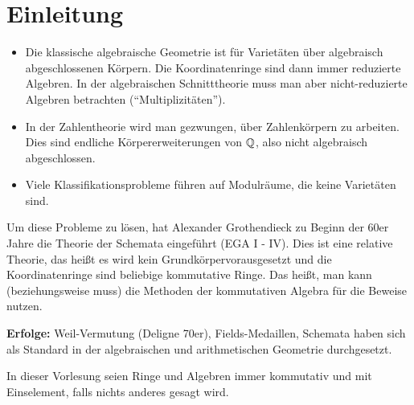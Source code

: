 \chapter{Einleitung}
\begin{itemize}
	\item Die klassische algebraische Geometrie ist für Varietäten über algebraisch abgeschlossenen Körpern. Die Koordinatenringe sind dann immer reduzierte Algebren. In der algebraischen Schnitttheorie muss man aber nicht-reduzierte Algebren betrachten (\enquote{Multiplizitäten}).
	\item In der Zahlentheorie wird man gezwungen, über Zahlenkörpern zu arbeiten. Dies sind endliche Körpererweiterungen von $\mathbb {Q}$, also nicht algebraisch abgeschlossen.
	\item Viele Klassifikationsprobleme führen auf Modulräume, die keine Varietäten sind.
\end{itemize}
Um diese Probleme zu lösen, hat Alexander Grothendieck zu Beginn der 60er Jahre die Theorie der Schemata eingeführt (EGA I - IV). Dies ist eine relative Theorie, das heißt es wird kein Grundkörpervorausgesetzt und die Koordinatenringe sind beliebige kommutative Ringe. Das heißt, man kann (beziehungsweise muss) die Methoden der kommutativen Algebra für die Beweise nutzen.

\textbf{Erfolge:} Weil-Vermutung (Deligne 70er), Fields-Medaillen, Schemata haben sich als Standard in der algebraischen und arithmetischen Geometrie durchgesetzt.

In dieser Vorlesung seien Ringe und Algebren immer kommutativ und mit Einselement, falls nichts anderes gesagt wird.
